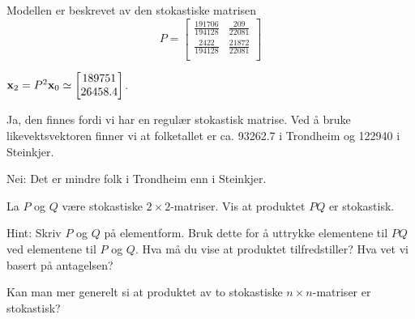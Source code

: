 \begin{losning}


\begin{punkt}
Modellen er beskrevet av den stokastiske matrisen $$P=\begin{bmatrix}
\frac{191706}{194128} & \frac{209}{22081}\\
\frac{2422}{194128} & \frac{21872}{22081}\\
\end{bmatrix}$$
\end{punkt}

\begin{punkt}
$\mathbf{x}_2=P^2\mathbf{x}_0\simeq \begin{bmatrix} 189751 \\ 26458.4 \end{bmatrix}$.
\end{punkt}

\begin{punkt}
Ja, den finnes fordi vi har en regulær stokastisk matrise. Ved å bruke likevektsvektoren finner vi at folketallet er ca. 93262.7 i Trondheim og 122940 i Steinkjer.
\end{punkt}

\begin{punkt}
Nei: Det er mindre folk i Trondheim enn i Steinkjer.
\end{punkt}

\end{losning}

\begin{oppgave}
\begin{punkt}
La $P$ og $Q$ være stokastiske $2\times 2$-matriser. Vis at produktet $PQ$ er stokastisk.

\noindent
Hint: Skriv $P$ og $Q$ på elementform. Bruk dette for å uttrykke elementene til $PQ$ ved elementene til $P$ og $Q$. Hva må du vise at produktet tilfredstiller? Hva vet vi basert på antagelsen?

\end{punkt}
\begin{punkt}
Kan man mer generelt si at produktet av to stokastiske $n\times n$-matriser er stokastisk?
\end{punkt}
\end{oppgave}


